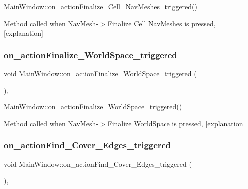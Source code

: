 \hyperlink{class_main_window_ac6952d7d9fe31aa25e570b898eb5257d}{Main\+Window\+::on\+\_\+action\+Finalize\+\_\+\+Cell\+\_\+\+Nav\+Meshes\+\_\+triggered()} 

Method called when Nav\+Mesh-\/$>$Finalize Cell Nav\+Meshes is pressed, \mbox{[}explanation\mbox{]} \mbox{\label{class_main_window_a583a8bf84d1bde5fcf6af19accaa625c}} 
\subsubsection{\texorpdfstring{on\+\_\+action\+Finalize\+\_\+\+World\+Space\+\_\+triggered}{on\_actionFinalize\_WorldSpace\_triggered}}
{\footnotesize\ttfamily void Main\+Window\+::on\+\_\+action\+Finalize\+\_\+\+World\+Space\+\_\+triggered (\begin{DoxyParamCaption}{ }\end{DoxyParamCaption})\hspace{0.3cm}{\ttfamily [private]}, {\ttfamily [slot]}}



\hyperlink{class_main_window_a583a8bf84d1bde5fcf6af19accaa625c}{Main\+Window\+::on\+\_\+action\+Finalize\+\_\+\+World\+Space\+\_\+triggered()} 

Method called when Nav\+Mesh-\/$>$Finalize World\+Space is pressed, \mbox{[}explanation\mbox{]} \mbox{\label{class_main_window_a23fdbcb0c33b6f6327cffa6d2debf1ed}} 
\subsubsection{\texorpdfstring{on\+\_\+action\+Find\+\_\+\+Cover\+\_\+\+Edges\+\_\+triggered}{on\_actionFind\_Cover\_Edges\_triggered}}
{\footnotesize\ttfamily void Main\+Window\+::on\+\_\+action\+Find\+\_\+\+Cover\+\_\+\+Edges\+\_\+triggered (\begin{DoxyParamCaption}{ }\end{DoxyParamCaption})\hspace{0.3cm}{\ttfamily [private]}, {\ttfamily [slot]}}



